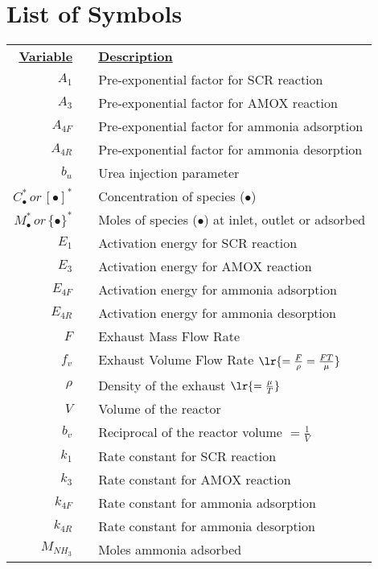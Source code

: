 \section{List of Symbols}

\begin{table}[H]
    \begin{tabular}{r c l}
        \textbf{\underline{Variable}} & & \textbf{\underline{Description}}\\
        $A_1$ & & Pre-exponential factor for SCR reaction\\
        $A_3$ & & Pre-exponential factor for AMOX reaction\\
        $A_{4F}$ & & Pre-exponential factor for ammonia adsorption\\
        $A_{4R}$ & & Pre-exponential factor for ammonia desorption\\
        $b_u$ & & Urea injection parameter\\
        $C_{\bullet}^{*} \,or \,  [\bullet]^{*}$ & &
        Concentration of species ($\bullet$) \\
        $M_{\bullet}^{*} \, or \,  \{\bullet\}^{*}$ & &
        Moles of species ($\bullet$) at inlet, outlet or adsorbed\\
        $E_1$ & & Activation energy for SCR reaction\\
        $E_3$ & & Activation energy for AMOX reaction\\
        $E_{4F}$ & & Activation energy for ammonia adsorption\\
        $E_{4R}$ & & Activation energy for ammonia desorption\\
        $F$ & & Exhaust Mass Flow Rate\\
        $f_v$ & & Exhaust Volume Flow Rate $\lr{=\frac{F}{\rho} = \frac{FT}{\mu}}$\\
        $\rho$ & & Density of the exhaust $\lr{=\frac{\mu}{T}}$\\
        $V$ & & Volume of the reactor\\
        $b_v$ & & Reciprocal of the reactor volume $=\frac{1}{V}$\\
        $k_1$ & & Rate constant for SCR reaction\\
        $k_3$ & & Rate constant for AMOX reaction\\
        $k_{4F}$ & & Rate constant for ammonia adsorption\\
        $k_{4R}$ & & Rate constant for ammonia desorption\\
        $M_{NH_3}$ & & Moles ammonia adsorbed\\

\end{tabular}
\end{table}
